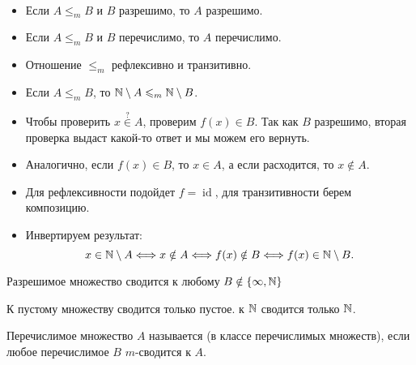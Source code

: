 \begin{prop}
	~\begin{itemize}
		\item Если $ A \le _{m} B$ и $ B$ разрешимо, то $ A$ разрешимо.
		\item Если $ A \le _{m} B$ и $ B$ перечислимо, то $ A$ перечислимо.
		\item Отношение $ \le _{m}$ рефлексивно и транзитивно.
		\item Если $ A \le _{m} B$, то $ \mathbb{N} \setminus A \leqslant _{m} \mathbb{N} \setminus B$.
	\end{itemize}
\end{prop}
\begin{proof*}
	\begin{itemize}
		\item Чтобы  проверить $ x \stackrel{?}{\in} A$, проверим $ f(x) \in B$. Так как $ B$ разрешимо, вторая проверка выдаст какой-то ответ и мы можем его вернуть.
		\item Аналогично, если $ f(x) \in B$, то $ x \in A$, а если расходится, то $ x \notin A$.
		\item Для рефлексивности подойдет $ f = \operatorname{id}$, для транзитивности берем композицию. 
		\item Инвертируем результат:
			\[
				x \in \mathbb{N} \setminus A \Longleftrightarrow x \notin A \Longleftrightarrow f(x) \notin B \Longleftrightarrow f(x) \in \mathbb{N} \setminus B
			.\] 
	\end{itemize}
\end{proof*}
\begin{note}
    Разрешимое множество сводится к любому $ B \notin \{\infty, \mathbb{N}\}$
\end{note}
\begin{note}
    К пустому множеству сводится только пустое. к $ \mathbb{N}$ сводится только $ \mathbb{N}$.
\end{note}


\begin{defn}[$ m$-полнота]
	Перечислимое множество $ A$ называется  (в классе перечислимых множеств), если любое перечислимое $ B$  $ m$-сводится к $ A$.
\end{defn}

